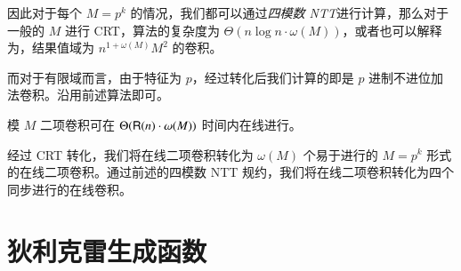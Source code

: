 因此对于每个 $M=p^k$ 的情况，我们都可以通过\emph{四模数 NTT}进行计算，那么对于一般的 $M$ 进行 CRT，算法的复杂度为 $\Theta(n\log n \cdot \omega(M))$，或者也可以解释为，结果值域为 $n^{1+\omega(M)}M^2$ 的卷积。

而对于有限域而言，由于特征为 $p$，经过转化后我们计算的即是 $p$ 进制不进位加法卷积。沿用前述算法即可。

\begin{theorem}
模 $M$ 二项卷积可在 $\Theta(\mathsf R(n)\cdot \omega(M))$ 时间内在线进行。
\end{theorem}

经过 CRT 转化，我们将在线二项卷积转化为 $\omega(M)$ 个易于进行的 $M=p^k$ 形式的在线二项卷积。通过前述的四模数 NTT 规约，我们将在线二项卷积转化为四个同步进行的在线卷积。

\section{狄利克雷生成函数}
